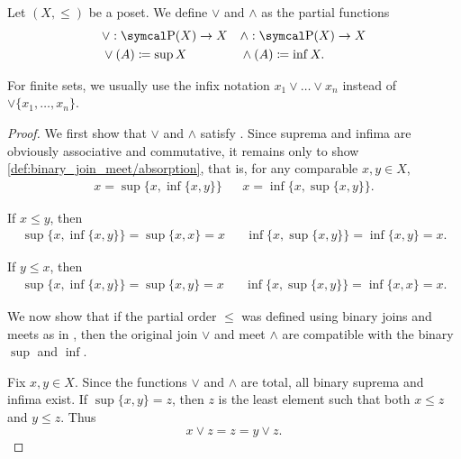 \begin{definition}\label{def:join_meet}
  Let \( (X, \leq) \) be a poset. We define  \( \vee \) and  \( \wedge \) as the partial functions
  \begin{align*}
    &\vee: \Power(X) \to X
    &&\wedge: \Power(X) \to X
    \\
    &\vee(A) \coloneqq \sup X
    &&\wedge(A) \coloneqq \inf X.
  \end{align*}

  For finite sets, we usually use the infix notation \( x_1 \vee \ldots \vee x_n \) instead of \( \vee \{ x_1, \ldots, x_n \} \).
\end{definition}
\begin{proof}
  We first show that \( \vee \) and \( \wedge \) satisfy . Since suprema and infima are obviously associative and commutative, it remains only to show \ref{def:binary_join_meet/absorption}, that is, for any comparable \( x, y \in X \),
  \begin{align*}
    x = \sup \{x, \inf \{ x, y \} \}
    &&
    x = \inf \{x, \sup \{ x, y \} \}.
  \end{align*}

  If \( x \leq y \), then
  \begin{align*}
    \sup \{ x, \inf \{ x, y \} \} = \sup \{ x, x \} = x
    &&
    \inf \{ x, \sup \{ x, y \} \} = \inf \{ x, y \} = x.
  \end{align*}

  If \( y \leq x \), then
  \begin{align*}
    \sup \{ x, \inf \{ x, y \} \} = \sup \{ x, y \} = x
    &&
    \inf \{ x, \sup \{ x, y \} \} = \inf \{ x, x \} = x.
  \end{align*}

  We now show that if the partial order \( \leq \) was defined using binary joins and meets as in , then the original join \( \vee \) and meet \( \wedge \) are compatible with the binary \( \sup \) and \( \inf \).

  Fix \( x, y \in X \). Since the functions \( \vee \) and \( \wedge \) are total, all binary suprema and infima exist. If \( \sup \{ x, y \} = z \), then \( z \) is the least element such that both \( x \leq z \) and \( y \leq z \). Thus
  \begin{equation*}
    x \vee z = z = y \vee z.
  \end{equation*}


\end{proof}
